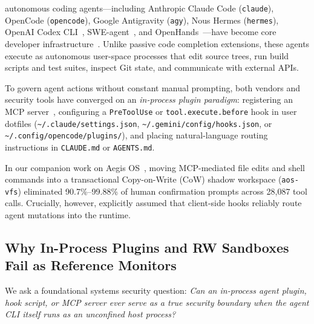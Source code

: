 \documentclass[10pt,journal,compsoc]{IEEEtran}
\begin{document}
\maketitle
\IEEEdisplaynontitleabstractindextext
\IEEEpeerreviewmaketitle


 autonomous coding agents---including Anthropic Claude Code (\texttt{claude}), OpenCode (\texttt{opencode}), Google Antigravity (\texttt{agy}), Nous Hermes (\texttt{hermes}), OpenAI Codex CLI~\cite{openai2025codex}, SWE-agent~\cite{yang2024sweagent}, and OpenHands~\cite{wang2025openhands}---have become core developer infrastructure~\cite{jimenez2024swebench,anthropic2024mcp}. Unlike passive code completion extensions, these agents execute as autonomous user-space processes that edit source trees, run build scripts and test suites, inspect Git state, and communicate with external APIs.

To govern agent actions without constant manual prompting, both vendors and security tools have converged on an \emph{in-process plugin paradigm}: registering an MCP server~\cite{anthropic2024mcp}, configuring a \texttt{PreToolUse} or \texttt{tool.execute.before} hook in user dotfiles (\texttt{\textasciitilde/.claude/\allowbreak settings.json}, \texttt{\textasciitilde/.gemini/\allowbreak config/\allowbreak hooks.json}, or \texttt{\textasciitilde/.config/\allowbreak opencode/\allowbreak plugins/}), and placing natural-language routing instructions in \texttt{CLAUDE.md} or \texttt{AGENTS.md}.

In our companion work on Aegis OS~\cite{zhao2026aegisos}, moving MCP-mediated file edits and shell commands into a transactional Copy-on-Write (CoW) shadow workspace (\texttt{aos-vfs}) eliminated 90.7\%--99.88\% of human confirmation prompts across 28,087 tool calls. Crucially, however, \cite{zhao2026aegisos} explicitly assumed that client-side hooks reliably route agent mutations into the runtime.

\subsection{Why In-Process Plugins and RW Sandboxes Fail as Reference Monitors}

We ask a foundational systems security question: \emph{Can an in-process agent plugin, hook script, or MCP server ever serve as a true security boundary when the agent CLI itself runs as an unconfined host process?}
\end{document}
